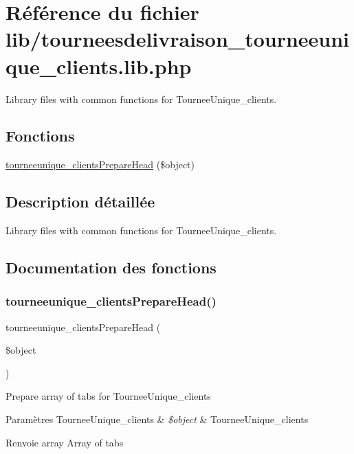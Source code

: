 \hypertarget{tourneesdelivraison__tourneeunique__clients_8lib_8php}{}\section{Référence du fichier lib/tourneesdelivraison\+\_\+tourneeunique\+\_\+clients.lib.\+php}
\label{tourneesdelivraison__tourneeunique__clients_8lib_8php}


Library files with common functions for Tournee\+Unique\+\_\+clients.  


\subsection*{Fonctions}
\begin{DoxyCompactItemize}
\item 
\hyperlink{tourneesdelivraison__tourneeunique__clients_8lib_8php_a1ae2a518d9f9023819c81f9c3e2edfb5}{tourneeunique\+\_\+clients\+Prepare\+Head} (\$object)
\end{DoxyCompactItemize}


\subsection{Description détaillée}
Library files with common functions for Tournee\+Unique\+\_\+clients. 



\subsection{Documentation des fonctions}
\mbox{\label{tourneesdelivraison__tourneeunique__clients_8lib_8php_a1ae2a518d9f9023819c81f9c3e2edfb5}} 
\subsubsection{\texorpdfstring{tourneeunique\+\_\+clients\+Prepare\+Head()}{tourneeunique\_clientsPrepareHead()}}
{\footnotesize\ttfamily tourneeunique\+\_\+clients\+Prepare\+Head (\begin{DoxyParamCaption}\item[{}]{\$object }\end{DoxyParamCaption})}

Prepare array of tabs for Tournee\+Unique\+\_\+clients


\begin{DoxyParams}[1]{Paramètres}
Tournee\+Unique\+\_\+clients & {\em \$object} & Tournee\+Unique\+\_\+clients \\
\hline
\end{DoxyParams}
\begin{DoxyReturn}{Renvoie}
array Array of tabs 
\end{DoxyReturn}
